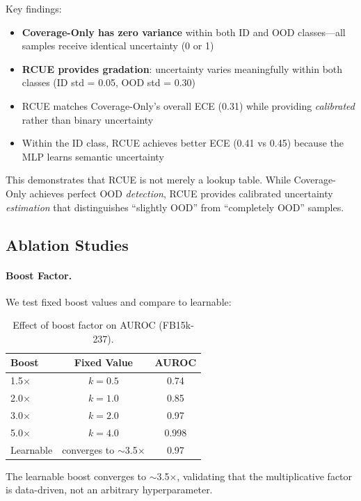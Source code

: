 Key findings:
\begin{itemize}
    \item \textbf{Coverage-Only has zero variance} within both ID and OOD classes---all samples receive identical uncertainty (0 or 1)
    \item \textbf{RCUE provides gradation}: uncertainty varies meaningfully within both classes (ID std = 0.05, OOD std = 0.30)
    \item RCUE matches Coverage-Only's overall ECE (0.31) while providing \emph{calibrated} rather than binary uncertainty
    \item Within the ID class, RCUE achieves better ECE (0.41 vs 0.45) because the MLP learns semantic uncertainty
\end{itemize}

This demonstrates that RCUE is not merely a lookup table. While Coverage-Only achieves perfect OOD \emph{detection}, RCUE provides calibrated uncertainty \emph{estimation} that distinguishes ``slightly OOD'' from ``completely OOD'' samples.

\subsection{Ablation Studies}

\paragraph{Boost Factor.}
We test fixed boost values and compare to learnable:

\begin{table}[h]
\centering
\caption{Effect of boost factor on AUROC (FB15k-237).}
\label{tab:boost}
\begin{tabular}{lcc}
\toprule
Boost & Fixed Value & AUROC \\
\midrule
1.5$\times$ & $k = 0.5$ & 0.74 \\
2.0$\times$ & $k = 1.0$ & 0.85 \\
3.0$\times$ & $k = 2.0$ & 0.97 \\
5.0$\times$ & $k = 4.0$ & 0.998 \\
\midrule
Learnable & converges to $\sim$3.5$\times$ & 0.97 \\
\bottomrule
\end{tabular}
\end{table}

The learnable boost converges to $\sim$3.5$\times$, validating that the multiplicative factor is data-driven, not an arbitrary hyperparameter.

